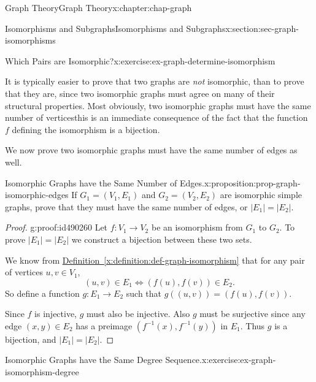 \documentclass[oneside,10pt,]{book}
\newcommand{\xreffont}{\relax}
\numberwithin{equation}{section}
\begin{document}
\begin{chapterptx}{Graph Theory}{}{Graph Theory}{}{}{x:chapter:chap-graph}
\begin{sectionptx}{Isomorphisms and Subgraphs}{}{Isomorphisms and Subgraphs}{}{}{x:section:sec-graph-isomorphisms}
\begin{inlineexercise}{Which Pairs are Isomorphic?}{x:exercise:ex-graph-determine-isomorphism}
\begin{sidebyside}{2}{0.0425}{0.0425}{0.085}
\begin{sbspanel}{0.23}
{
}%
\end{sbspanel}%
\end{sidebyside}%
\end{inlineexercise}
It is typically easier to prove that two graphs are \emph{not} isomorphic, than to prove that they are, since two isomorphic graphs must agree on many of their structural properties. Most obviously, two isomorphic graphs must have the same number of vertices\textemdash{}this is an immediate consequence of the fact that the function \(f\) defining the isomorphism is a bijection.%
\par
We now prove two isomorphic graphs must have the same number of edges as well.%
\begin{proposition}{Isomorphic Graphs have the Same Number of Edges.}{}{x:proposition:prop-graph-isomorphic-edges}%
If \(G_1 = (V_1,E_1)\) and \(G_2 = (V_2,E_2)\) are isomorphic simple graphs, prove that they must have the same number of edges, or \(|E_1| = |E_2|\).%
\end{proposition}
\begin{proof}{}{g:proof:id490260}
Let \(f: V_1 \rightarrow V_2\) be an isomorphism from \(G_1\) to \(G_2\). To prove \(|E_1| = |E_2|\) we construct a bijection between these two sets.%
\par
We know from \hyperref[x:definition:def-graph-isomorphism]{Definition~{\xreffont\ref{x:definition:def-graph-isomorphism}}} that for any pair of vertices \(u,v \in V_1\),%
\begin{equation*}
(u,v) \in E_1 \Leftrightarrow (f(u),f(v)) \in E_2\text{.}
\end{equation*}
So define a function \(g: E_1 \rightarrow E_2\) such that \(g\left( (u,v) \right) = \left( f(u),f(v)\right)\).%
\par
Since \(f\) is injective, \(g\) must also be injective. Also \(g\) must be surjective since any edge \((x,y) \in E_2\) has a preimage \((f^{-1}(x),f^{-1}(y))\) in \(E_1\). Thus \(g\) is a bijection, and \(|E_1| = |E_2|\).%
\end{proof}
\begin{inlineexercise}{Isomorphic Graphs have the Same Degree Sequence.}{x:exercise:ex-graph-isomorphism-degree}%

\end{inlineexercise}
\end{sectionptx}
\end{chapterptx}
\end{document}
